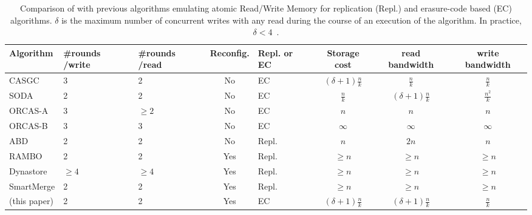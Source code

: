 		\begin{table*}[!h]
			{\scriptsize
			\begin{center}
				\begin{tabular}{|lP{1cm}P{1cm}cP{1cm}ccc|}
					\hline
					\textbf{Algorithm}  & \textbf{\#rounds /write}  & \textbf{\#rounds /read} & \textbf{Reconfig.}  & \textbf{Repl. or EC} & \textbf{Storage cost}  & \textbf{read bandwidth} & \textbf{write bandwidth}  \\ 
					\hline

					{\sc CASGC} \cite{CLMM14} & 3 & 2 & No  & EC & $(\delta +1)\frac{n}{k}$  & $\frac{n}{k}$   & $\frac{n}{k}$ \\
					{\sc  SODA} \cite{SODA2016} & 2 & 2 & No & EC & $\frac{n}{k}$ & $(\delta +1)\frac{n}{k}$  & $\frac{n^2}{k}$ \\  
					{\sc ORCAS-A} \cite{DGL08} & 3 & $\geq 2$ & No  & EC & $n$ & $n$ & $n$ \\ 
					{\sc ORCAS-B} \cite{DGL08} & 3 & 3 & No  & EC & $\infty$ & $\infty$ & $\infty$ \\ 
					{\sc ABD} \cite{ABD96} & 2 & 2 & No  & Repl. & $n$ & $2n$  & $n$ \\ 
					{\sc RAMBO} \cite{LS02} & 2 & 2 & Yes  & Repl. & $\geq n$ & $\geq n$  &$\geq n$ \\
					{\sc Dynastore} \cite{AKMS09} & $\geq 4$ & $\geq 4$ & Yes & Repl. & $\geq n$ & $\geq n$ & $\geq n$ \\
					{\sc SmartMerge} \cite{LVM15} & 2 & 2  & Yes  & Repl. & $\geq n$ & $\geq n$ & $\geq n$ \\
					\hline\hline
					\ares{} (this paper) & 2 & 2 & Yes & EC & $(\delta +1)\frac{n}{k}$ & $(\delta +1)\frac{n}{k}$  & $\frac{n}{k}$ \\ \hline
				\end{tabular}
			\end{center}
		}
			\caption{Comparison of \ares{} with previous algorithms emulating atomic Read/Write Memory for replication (Repl.) 
			and erasure-code based (EC) algorithms.  $\delta$ is the maximum number of concurrent writes with any read during the course of an execution of the algorithm. In practice, $\delta < 4$~\cite{GIZA2017}.
			}\label{tab:compare}
		\end{table*}	

